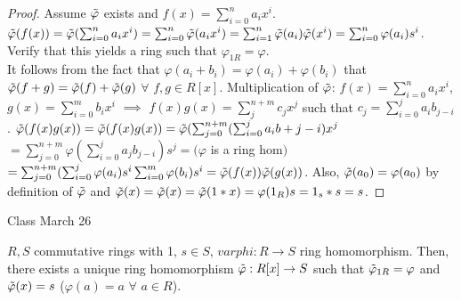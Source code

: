 \documentclass[11pt]{article}
\theoremstyle{definition}
\numberwithin{equation}{section}
\begin{document}
\begin{proof}
Assume $\Tilde{\varphi}$ exists and $f(x) = \sum_{i = 0}^{n}a_{i}x^{i}$. $\Tilde{\varphi}(f(x)) = \Tilde{\varphi}(\sum_{i =  0}^{n}a_{i}x^{i}) = \sum_{i = 0}^{n} \Tilde{\varphi}(a_{i}x^{i}) = \sum_{i=1}^{n} \Tilde{\varphi}(a_{i})\Tilde{\varphi}(x^{i}) = \sum_{i = 0}^{n}\varphi(a_{i})s^{i}$. Verify that this yields a ring such that $\varphi_{1R} = \varphi$.\\
It follows from the  fact that $\varphi(a_{i} + b_{i}) = \varphi(a_{i}) + \varphi(b_{i})$ that $\Tilde{\varphi}(f+g) = \Tilde{\varphi}(f)+\Tilde{\varphi}(g)$ $\forall$ $f, g \in R[x]$. Multiplication of $\Tilde{\varphi}$: $f(x) = \sum_{i = 0}^{n} a_{i}x^{i}$, $g(x) = \sum_{i = 0}^{m} b_{i}x^{i}$ $\implies$ $f(x)g(x) = \sum_{j}^{n+m}c_{j}x^{j}$ such that $c_{j} = \sum_{i=0}^{j}a_{i}b_{j-i}$. $\Tilde{\varphi}(f(x)g(x)) = \Tilde{\varphi}(f(x)g(x)) = \Tilde{\varphi}(\sum_{j = 0}^{n+m}(\sum_{i = 0}^{j}a_{i}b+{j-i})x^{j}$ $= \sum_{j = 0}^{n+m} \varphi(\sum_{i = 0}^{j} a_{j}b_{j-i})s^{j} = (\varphi$ is a ring hom$)$ $= \sum_{j=0}^{n+m}(\sum_{i = 0}^{j} \varphi(a_{i})s^{i} \sum_{i = 0}^{m} \varphi(b_{i})s^{i} = \Tilde{\varphi}(f(x))\Tilde{\varphi}(g(x))$. Also, $\Tilde{\varphi}(a_0) = \varphi(a_{0})$ by definition of $\Tilde{\varphi}$ and $\Tilde{\varphi}(x) = \Tilde{\varphi}(x) = \Tilde{\varphi}(1*x) = \varphi(1_{R})s = 1_{s}*s = s$.
\end{proof}

\begin{center}
{\sf\LARGE Class March 26}
\end{center}

\begin{proposition}
$R, S$ commutative rings with 1, $s \in S$, $varphi:R \rightarrow S$ ring homomorphism. Then, there exists a unique ring homomorphism $\Tilde{\varphi}: R[x] \rightarrow S$ such that $\Tilde{\varphi}_{1R} = \varphi$ and $\Tilde{\varphi}(x) = s$ ($\varphi(a) = a$ $\forall$ $a \in R$).
\end{proposition}
\end{document}
